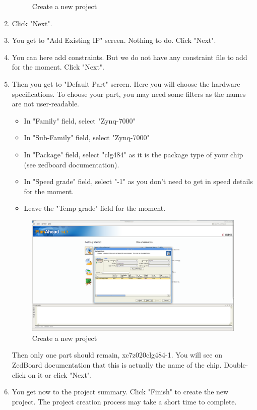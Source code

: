 \documentclass{article}
\begin{document}
\begin{enumerate}
\begin{figure}
	\caption{Create a new project}
	\end{figure}
	\item Click "Next".
	\item You get to "Add Existing IP" screen. Nothing to do. Click "Next".
	\item You can here add constraints. But we do not have any constraint file	to add for the moment. Click "Next".
	\item Then you get to "Default Part" screen. Here you will choose the
	hardware specifications. To choose your part, you may need some filters as
	the names are not user-readable.
	\begin{itemize}
		\item In "Family" field, select "Zynq-7000"
		\item In "Sub-Family" field, select "Zynq-7000"
		\item In "Package" field, select "clg484" as it is the package type of
		your chip (see zedboard documentation).
		\item In "Speed grade" field, select "-1" as you don't need to get in speed details for the moment.
		\item Leave the "Temp grade" field for the moment.
	\end{itemize}
	\begin{figure}
	\includegraphics[scale=0.25]{pictures/CreateNewProject4.png}
	\caption{Create a new project}
	\end{figure}
	Then only one part should remain, xc7z020clg484-1. You will see on ZedBoard
	documentation that this is actually the name of the chip. Double-click on it
	or click "Next".
	\item You get now to the project summary. Click "Finish" to create the new
	project. The project creation process may take a short time to complete.
	\begin{figure}

\end{figure}
\end{enumerate}
\end{document}

